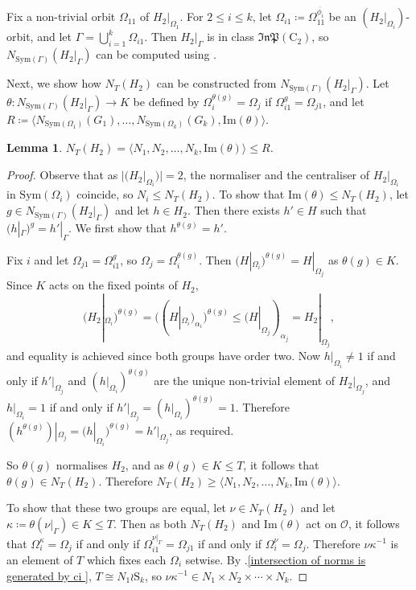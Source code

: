 \documentclass[11pt,a4paper]{article}
\newtheorem{lemma}[theorem]{Lemma}
\theoremstyle{definition}
\theoremstyle{remark}
\newcommand{\Sym}[0]{\mathrm{Sym}}
\newcommand{\InP}{\mathfrak{InP}}
\newcommand{\Sy}{\mathrm{S}}
\newcommand{\Cy}{\mathrm{C}}
\begin{document}
Fix a non-trivial orbit $\Omega_{11}$ of $H_2|_{\Omega_1}$. 
For $2 \leq i \leq k$, let $\Omega_{i1}  \coloneqq  \Omega_{11}^{\overline{\phi_i}}$ be an $(H_2|_{\Omega_i})$-orbit, and let $\Gamma = \bigcup_{i=1}^k \Omega_{i1}$. 
Then $H_2|_{\Gamma}$ is in class $\InP(\Cy_2)$, so $N_{\Sym(\Gamma)}(H_2|_{\Gamma})$ can be computed using .

Next, we show how $N_T(H_2)$ can be constructed from $N_{\Sym(\Gamma)}(H_2|_{\Gamma})$. 
Let $\theta: N_{\Sym(\Gamma)}(H_2|_{\Gamma}) \rightarrow K$ be defined by  $\Omega_{i}^{\theta(g)}= \Omega_{j}$ if $\Omega_{i1}^g= \Omega_{j1}$, and let $R  \coloneqq  \langle N_{\Sym(\Omega_1)}(G_1), \ldots,N_{\Sym(\Omega_k)}(G_k), \mathrm{Im}(\theta) \rangle$. 

\begin{lemma} \label{I in ci wr Sk}
$N_T(H_2) = \langle  N_1, N_2, \ldots, N_k, \mathrm{Im}(\theta) \rangle \leq R$. 
\end{lemma}
\begin{proof}
Observe that as $|(H_2|_{\Omega_i})|=2$, the normaliser and the centraliser of $H_2|_{\Omega_i}$ in $\Sym(\Omega_i)$ coincide, 
so $N_i \leq N_T(H_2)$. 
To show that $\mathrm{Im}(\theta) \leq N_T(H_2)$, let $g \in N_{\Sym(\Gamma)}(H_2|_{\Gamma})$ and let $h \in H_2$.
Then there exists $h' \in H$ such that $(h|_{\Gamma})^{g} = h'|_{\Gamma}$. 
We first show that $ h^{\theta(g)} = h'$. %

Fix $i$ and let $\Omega_{j1}= \Omega_{i1}^g$, so $\Omega_j = \Omega_i^{\theta(g)}$. 
Then $(H|_{\Omega_{i}})^{\theta(g)} =  H|_{\Omega_{j}}$ as $\theta(g) \in K$. 
Since $K$ acts on the fixed points of $H_2$,
\[ 
(H_2|_{\Omega_{i}})^{\theta(g)} = ((H|_{\Omega_{i}} )_{\alpha_i})^{\theta(g)} 
\leq (H|_{\Omega_{j}} )_{\alpha_j} = H_2|_{\Omega_{j}},
\]
and equality is achieved since both groups have order two. 
Now $h|_{\Omega_i} \neq 1$ if and only if $h'|_{\Omega_j}$ and $(h|_{\Omega_{i}})^{\theta(g)}$ are the unique non-trivial element of $H_2|_{\Omega_j}$, and $h|_{\Omega_i} = 1$ if and only if $h'|_{\Omega_j}=(h|_{\Omega_{i}})^{\theta(g)}=1$.  
Therefore $(h^{\theta(g)})|_{\Omega_{j}}  = (h|_{\Omega_{i}})^{\theta(g)} = h'|_{\Omega_j} $, as required.  

So $\theta(g)$ normalises $H_2$, and as $\theta(g) \in K \leq T$, it follows that $\theta(g) \in N_T(H_2)$. 
Therefore $N_T(H_2) \geq \langle  N_1, N_2, \ldots, N_k,  \mathrm{Im}(\theta) \rangle$. 

To show that these two groups are equal, let $\nu \in N_T(H_2)$ and let $\kappa  \coloneqq  \theta(\nu|_{\Gamma}) \in K \leq T$. Then as both $N_T(H_2)$ and $\mathrm{Im}(\theta)$ act on $\mathcal{O}$, it follows that $\Omega_i^{\kappa} = \Omega_j$ if and only if $\Omega_{i1}^{\nu|_{\Gamma}} = \Omega_{j1}$ if and only if $\Omega_{i}^{\nu} = \Omega_{j}$. 
Therefore $\nu \kappa^{-1}$ is an element of $T$ which fixes each $\Omega_i$ setwise. 
By .\ref{intersection of norms is generated by ci }, $T \cong N_1 \wr \Sy_k$, so $\nu \kappa^{-1} \in  N_1 \times N_2 \times \cdots \times N_k $. 
\end{proof}
\end{document}

